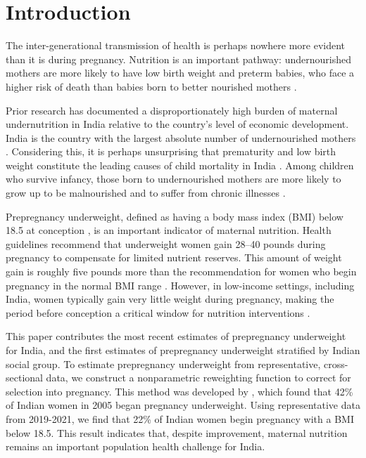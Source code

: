 \documentclass[12pt]{article}
\begin{document}
\section*{Introduction}

The inter-generational transmission of health is perhaps nowhere more evident than it is during pregnancy. Nutrition is an important pathway: undernourished mothers are more likely to have low birth weight and preterm babies, who face a higher risk of death than babies born to better nourished mothers \citep{ahmed2013global, aizer2014intergenerational}.  

Prior research has documented a disproportionately high burden of maternal undernutrition in India relative to the country’s level of economic development.  India is the country with the largest absolute number of undernourished mothers \citep{bhutta2000has, coffey2015prepregnancy}. Considering this, it is perhaps unsurprising that prematurity and low birth weight constitute the leading causes of child mortality in India \citep{fadel2017changes}. Among children who survive infancy, those born to undernourished mothers are more likely to grow up to be malnourished and to suffer from chronic illnesses \citep{underwood2002health, almond2011killing}.

Prepregnancy underweight, defined as having a body mass index (BMI) below 18.5 at conception \citep{who_nlis_malnutrition_women_2021}, is an important indicator of maternal nutrition. Health guidelines recommend that underweight women gain 28–40 pounds during pregnancy to compensate for limited nutrient reserves.  This amount of weight gain is roughly five pounds more than the recommendation for women who begin pregnancy in the normal BMI range \citep{yaktine2010weight, ismail2016gestational}. However, in low-income settings, including India, women typically gain very little weight during pregnancy, making the period before conception a critical window for nutrition interventions \citep{stephenson2018before, coffey2015prepregnancy, wang2020gestational, perumal2023suboptimal}.

This paper contributes the most recent estimates of prepregnancy underweight for India, and the first estimates of prepregnancy underweight stratified by Indian social group. To estimate prepregnancy underweight from representative, cross-sectional data, we construct a nonparametric reweighting function to correct for selection into pregnancy.  This method was developed by \cite{coffey2015prepregnancy}, which found that 42\% of Indian women in 2005 began pregnancy underweight.  Using representative data from 2019-2021, we find that 22\% of Indian women begin pregnancy with a BMI below 18.5. This result indicates that, despite improvement, maternal nutrition remains an important population health challenge for India.  
\end{document}
